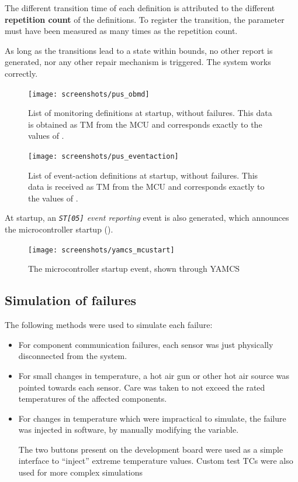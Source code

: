 \documentclass[a4paper,nobib,final]{tufte-book}
\begin{document}
The different transition time of each definition is attributed to the different \textbf{repetition count} of the definitions. To register the transition, the parameter must have been measured as many times as the repetition count.

As long as the transitions lead to a state within bounds, no other report is generated, nor any other repair mechanism is triggered. The system works correctly.

\begin{figure}[h]
	\texttt{[image: screenshots/pus\_obmd]}
	\caption[List of monitoring definitions at startup, without failures]{List of monitoring definitions at startup, without failures. This data is obtained as \acs{TM} from the \acs{MCU} and corresponds exactly to the values of .}
		\label{fig:pus_obmd}
\end{figure}
	
\begin{figure}[h]
	\texttt{[image: screenshots/pus\_eventaction]}
	\caption[List of event-action definitions]{List of event-action definitions at startup, without failures. This data is received as \acs{TM} from the \acs{MCU} and corresponds exactly to the values of .}
		\label{fig:pus_eventaction}
\end{figure}
		
At startup, an \emph{\texttt{ST[05]} event reporting} event is also generated, which announces the microcontroller startup ().
			
\begin{figure}[h]
	\centering
	\caption{The microcontroller startup event, shown through \acs{YAMCS}}
	\label{fig:yamcsmcustart}
	\texttt{[image: screenshots/yamcs\_mcustart]}
\end{figure}

\FloatBarrier
\subsection{Simulation of failures}
\label{sec:simul}

The following methods were used to simulate each failure:
\begin{itemize}
	\item For component communication failures, each sensor was just physically disconnected from the system.
	\item For small changes in temperature, a hot air gun or other hot air source was pointed towards each sensor. Care was taken to not exceed the rated temperatures of the affected components.
	\item For changes in temperature which were impractical to simulate, the failure was injected in software, by manually modifying the variable.
	
	The two buttons present on the development board were used as a simple interface to ``inject'' extreme temperature values. Custom test \acsp{TC} were also used for more complex simulations
\end{itemize}
\end{document}
